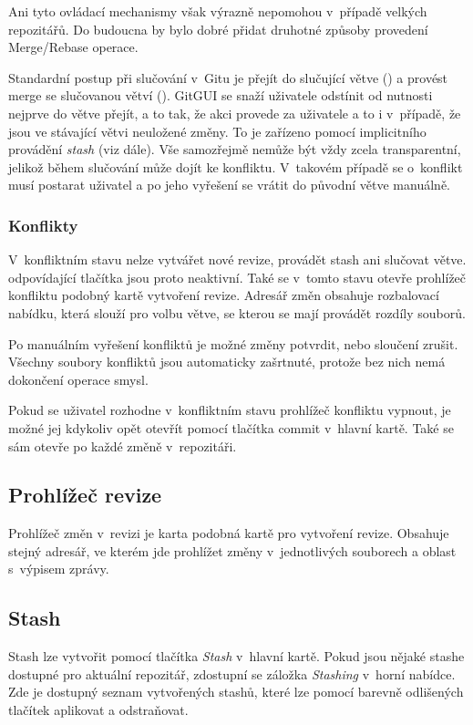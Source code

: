 \documentclass[
  biblatex,
  glossaries,
  index
]{kidiplom}
\begin{document}
Ani tyto ovládací mechanismy však výrazně nepomohou v~případě velkých repozitářů. Do budoucna by bylo dobré přidat druhotné způsoby provedení Merge/Rebase operace.

Standardní postup při slučování v~Gitu je přejít do slučující větve () a provést merge se slučovanou větví (). GitGUI se snaží uživatele odstínit od nutnosti nejprve do větve přejít, a to tak, že akci provede za uživatele a to i v~případě, že jsou ve stávající větvi neuložené změny. To je zařízeno pomocí implicitního provádění {\it stash} (viz dále). Vše samozřejmě nemůže být vždy zcela transparentní, jelikož během slučování může dojít ke konfliktu. V~takovém případě se o~konflikt musí postarat uživatel a po jeho vyřešení se vrátit do původní větve manuálně.

\subsubsection{Konflikty}
V~konfliktním stavu nelze vytvářet nové revize, provádět stash ani slučovat větve. odpovídající tlačítka jsou proto neaktivní. Také se v~tomto stavu otevře prohlížeč konfliktu podobný kartě vytvoření revize. Adresář změn obsahuje rozbalovací nabídku, která slouží pro volbu větve, se kterou se mají provádět rozdíly souborů.

Po manuálním vyřešení konfliktů je možné změny potvrdit, nebo sloučení zrušit. Všechny soubory konfliktů jsou automaticky zašrtnuté, protože bez nich nemá dokončení operace smysl.

Pokud se uživatel rozhodne v~konfliktním stavu prohlížeč konfliktu vypnout, je možné jej kdykoliv opět otevřít pomocí tlačítka commit v~hlavní kartě. Také se sám otevře po každé změně v~repozitáři.

\subsection{Prohlížeč revize}
Prohlížeč změn v~revizi je karta podobná kartě pro vytvoření revize. Obsahuje stejný adresář, ve kterém jde prohlížet změny v~jednotlivých souborech a oblast s~výpisem zprávy.

\subsection{Stash}
Stash lze vytvořit pomocí tlačítka {\it Stash} v~hlavní kartě. Pokud jsou nějaké stashe dostupné pro aktuální repozitář, zdostupní se záložka {\it Stashing} v~horní nabídce. Zde je dostupný seznam vytvořených stashů, které lze pomocí barevně odlišených tlačítek aplikovat a odstraňovat.
\end{document}
